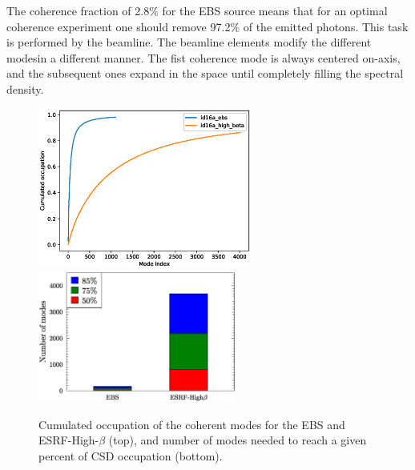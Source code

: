 \documentclass{iucr}              %
\begin{document}
The coherence fraction of 2.8\% for the EBS source means that for an optimal coherence experiment one should remove 97.2\% of the emitted photons. This task is performed by the beamline. The beamline elements modify the different modesin a different manner. The fist coherence mode is always centered on-axis, and the subsequent ones expand in the space until completely filling the spectral density.   
\begin{figure}
    \centering
        \includegraphics[width=7cm]{GRAPHICS/cumulated_occupation.eps}
        \includegraphics[width=6.5cm]{GRAPHICS/up_to_mode_id16a.eps}
    \label{histomodes}
    \caption{Cumulated occupation of the coherent modes for the EBS and ESRF-High-$\beta$ (top), and number of modes needed to reach a given percent of CSD occupation (bottom). }
\end{figure}
\end{document}
